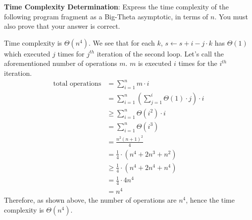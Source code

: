 \textbf{Time Complexity Determination}: Express the time complexity of the following program fragment as a 
Big-Theta asymptotic, in terms of $n$. You must also prove that your answer is correct.

\begin{algorithm}
    \SetAlgoLined
    \DontPrintSemicolon
\end{algorithm}
\begin{customsolutionbox}
    Time complexity is $\Theta(n^4)$. We see that for each $k$, $s \gets s + i - j \cdot k$ has $\Theta(1)$ which 
    executed $j$ times for $j^{th}$ iteration of the second loop. Let's call the aforementioned number of 
    operations $m$. $m$ is executed $i$ times for the $i^{th}$ iteration.
    \begin{align}
        \text{total operations} &= \sum_{i=1}^{n}m \cdot i \\
        &=  \sum_{i=1}^{n} \left(\sum_{j=1}^{i} \Theta(1) \cdot j\right)\cdot i \\
        &\geq \sum_{i=1}^{n} \Theta(i^2) \cdot i \\
        &= \sum_{i=1}^{n} \Theta(i^3) \\
        &= \frac{n^2(n+1)^2}{4} \\
        &= \frac{1}{4} \cdot \left(n^4+2n^3+n^2\right) \\
        &\geq \frac{1}{4} \cdot \left(n^4+2n^4+n^4\right) \\
        &=\frac{1}{4} \cdot 4n^4 \\
        &= n^4
    \end{align}
Therefore, as shown above, the number of operations are $n^4$, hence the time complexity is $\Theta(n^4)$.
\end{customsolutionbox}